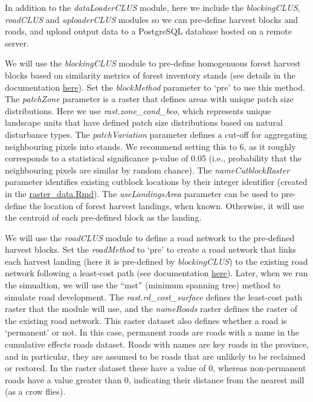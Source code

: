 \documentclass[
]{article}
\begin{document}
In addition to the \emph{dataLoaderCLUS} module, here we include the
\emph{blockingCLUS}, \emph{roadCLUS} and \emph{uploaderCLUS} modules so
we can pre-define harvest blocks and roads, and upload output data to a
PostgreSQL database hosted on a remote server.

We will use the \emph{blockingCLUS} module to pre-define homogenuous
forest harvest blocks based on similarity metrics of forest inventory
stands (see details in the documentation
\href{https://github.com/bcgov/clus/blob/main/reports/harvest/draft-CLUS-blocking.md}{here}).
Set the \emph{blockMethod} parameter to `pre' to use this method. The
\emph{patchZone} parameter is a raster that defines areas with unique
patch size distributions. Here we use \emph{rast.zone\_cond\_beo}, which
represents unique landscape units that have defined patch size
distributions based on natural disturbance types. The
\emph{patchVariation} parameter defines a cut-off for aggregating
neighbouring pixels into stands. We recommend setting this to 6, as it
roughly corresponds to a statistical significance p-value of 0.05 (i.e.,
probability that the neighbouring pixels are similar by random chance).
The \emph{nameCutblockRaster} parameter identifies existing cutblock
locations by their integer identifier (created in the
\href{https://github.com/bcgov/clus/blob/main/R/Params/raster_data.Rmd}{raster\_data.Rmd}).
The \emph{useLandingsArea} parameter can be used to pre-define the
location of forest harvest landings, when known. Otherwise, it will use
the centroid of each pre-defined block as the landing.

We will use the \emph{roadCLUS} module to define a road network to the
pre-defined harvest blocks. Set the \emph{roadMethod} to `pre' to create
a road network that links each harvest landing (here it is pre-defined
by \emph{blockingCLUS}) to the existing road network following a
least-cost path (see documentation
\href{https://github.com/bcgov/clus/blob/main/reports/roads/draft-CLUS-roads.md}{here}).
Later, when we run the simualtion, we will use the ``mst'' (minimum
spanning tree) method to simulate road development. The
\emph{rast.rd\_cost\_surface} defines the least-cost path raster that
the module will use, and the \emph{nameRoads} raster defines the raster
of the existing road network. This raster dataset also defines whether a
road is `permanent' or not. In this case, permanent roads are roads with
a name in the cumulative effects roads dataset. Roads with names are key
roads in the province, and in particular, they are assumed to be roads
that are unlikely to be reclaimed or restored. In the raster dataset
these have a value of 0, whereas non-permanent roads have a value
greater than 0, indicating their distance from the nearest mill (as a
crow flies).
\end{document}

